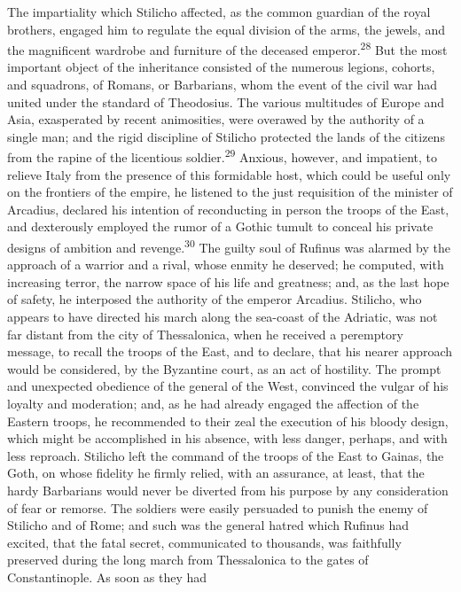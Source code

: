 The impartiality which Stilicho affected, as the common guardian
of the royal brothers, engaged him to regulate the equal division
of the arms, the jewels, and the magnificent wardrobe and
furniture of the deceased emperor.\textsuperscript{28} But the most important
object of the inheritance consisted of the numerous legions,
cohorts, and squadrons, of Romans, or Barbarians, whom the event
of the civil war had united under the standard of Theodosius. The
various multitudes of Europe and Asia, exasperated by recent
animosities, were overawed by the authority of a single man; and
the rigid discipline of Stilicho protected the lands of the
citizens from the rapine of the licentious soldier.\textsuperscript{29} Anxious,
however, and impatient, to relieve Italy from the presence of
this formidable host, which could be useful only on the frontiers
of the empire, he listened to the just requisition of the
minister of Arcadius, declared his intention of reconducting in
person the troops of the East, and dexterously employed the rumor
of a Gothic tumult to conceal his private designs of ambition and
revenge.\textsuperscript{30} The guilty soul of Rufinus was alarmed by the
approach of a warrior and a rival, whose enmity he deserved; he
computed, with increasing terror, the narrow space of his life
and greatness; and, as the last hope of safety, he interposed the
authority of the emperor Arcadius. Stilicho, who appears to have
directed his march along the sea-coast of the Adriatic, was not
far distant from the city of Thessalonica, when he received a
peremptory message, to recall the troops of the East, and to
declare, that his nearer approach would be considered, by the
Byzantine court, as an act of hostility. The prompt and
unexpected obedience of the general of the West, convinced the
vulgar of his loyalty and moderation; and, as he had already
engaged the affection of the Eastern troops, he recommended to
their zeal the execution of his bloody design, which might be
accomplished in his absence, with less danger, perhaps, and with
less reproach. Stilicho left the command of the troops of the
East to Gainas, the Goth, on whose fidelity he firmly relied,
with an assurance, at least, that the hardy Barbarians would
never be diverted from his purpose by any consideration of fear
or remorse. The soldiers were easily persuaded to punish the
enemy of Stilicho and of Rome; and such was the general hatred
which Rufinus had excited, that the fatal secret, communicated to
thousands, was faithfully preserved during the long march from
Thessalonica to the gates of Constantinople. As soon as they had
